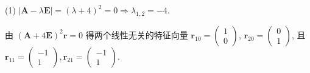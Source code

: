 \begin{solution}
  (1) $|\bm{A}-\lambda\bm{E}|=(\lambda+4)^2=0\Rightarrow\lambda_{1,2}=-4$.

  由 $(\bm{A}+4\bm{E})^2\bm{r}=0$ 得两个线性无关的特征向量
  $\bm{r}_{10}=\begin{pmatrix}1\\0\end{pmatrix}$,
  $\bm{r}_{20}=\begin{pmatrix}0\\1\end{pmatrix}$, 
  且 $\bm{r}_{11}=\begin{pmatrix}-1\\1\end{pmatrix},\bm{r}_{21}=\begin{pmatrix}-1\\1\end{pmatrix}$.


\end{solution}
